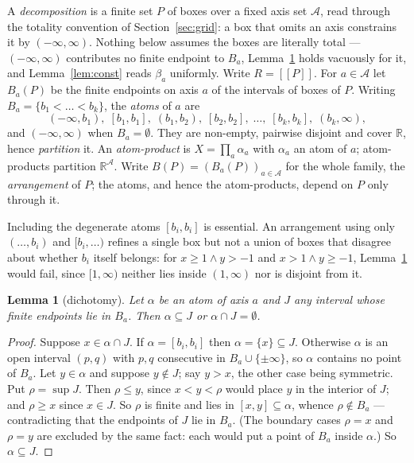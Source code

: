 \documentclass[11pt,a4paper]{article}
\theoremstyle{plain}
\newtheorem{lemma}[theorem]{Lemma}
\theoremstyle{definition}
\theoremstyle{remark}
\newcommand{\R}{\mathbb{R}}
\newcommand{\sem}[1]{[\![#1]\!]}
\newcommand{\Ax}{\mathcal{A}}
\begin{document}
A \emph{decomposition} is a finite set $P$ of boxes over a fixed axis set $\Ax$,
read through the totality convention of Section~\ref{sec:grid}: a box that omits
an axis constrains it by $(-\infty,\infty)$. Nothing below assumes the boxes are
literally total --- $(-\infty,\infty)$ contributes no finite endpoint to $B_a$,
Lemma~\ref{lem:dich} holds vacuously for it, and Lemma~\ref{lem:const} reads
$\beta_a$ uniformly. Write $R = \sem{P}$. For $a \in \Ax$ let $B_a(P)$ be the
finite endpoints on axis $a$ of the intervals of boxes of $P$. Writing
$B_a = \{b_1 < \dots < b_k\}$, the \emph{atoms} of $a$ are
\[
  (-\infty,b_1),\; [b_1,b_1],\; (b_1,b_2),\; [b_2,b_2],\; \dots,\; [b_k,b_k],\; (b_k,\infty),
\]
and $(-\infty,\infty)$ when $B_a = \emptyset$. They are non-empty, pairwise
disjoint and cover $\R$, hence \emph{partition} it. An \emph{atom-product} is
$X = \prod_{a} \alpha_a$ with $\alpha_a$ an atom of $a$; atom-products partition
$\R^{\Ax}$. Write $B(P) = (B_a(P))_{a \in \Ax}$ for the whole family, the
\emph{arrangement} of $P$; the atoms, and hence the atom-products, depend on $P$
only through it.

Including the degenerate atoms $[b_i,b_i]$ is essential. An arrangement using
only $(\dots,b_i)$ and $[b_i,\dots)$ refines a single box but not a union of
boxes that disagree about whether $b_i$ itself belongs: for
$x \ge 1 \wedge y > -1$ and $x > 1 \wedge y \ge -1$, Lemma~\ref{lem:dich} would
fail, since $[1,\infty)$ neither lies inside $(1,\infty)$ nor is disjoint from
it.

\begin{lemma}[dichotomy]\label{lem:dich}
Let $\alpha$ be an atom of axis $a$ and $J$ any interval whose finite endpoints
lie in $B_a$. Then $\alpha \subseteq J$ or $\alpha \cap J = \emptyset$.
\end{lemma}

\begin{proof}
Suppose $x \in \alpha \cap J$. If $\alpha = [b_i,b_i]$ then $\alpha = \{x\}
\subseteq J$. Otherwise $\alpha$ is an open interval $(p,q)$ with $p,q$
consecutive in $B_a \cup \{\pm\infty\}$, so $\alpha$ contains no point of $B_a$.
Let $y \in \alpha$ and suppose $y \notin J$; say $y > x$, the other case being
symmetric. Put $\rho = \sup J$. Then $\rho \le y$, since $x < y < \rho$ would
place $y$ in the interior of $J$; and $\rho \ge x$ since $x \in J$. So $\rho$ is
finite and lies in $[x,y] \subseteq \alpha$, whence $\rho \notin B_a$ ---
contradicting that the endpoints of $J$ lie in $B_a$. (The boundary cases
$\rho = x$ and $\rho = y$ are excluded by the same fact: each would put a point
of $B_a$ inside $\alpha$.) So $\alpha \subseteq J$.
\end{proof}
\end{document}
